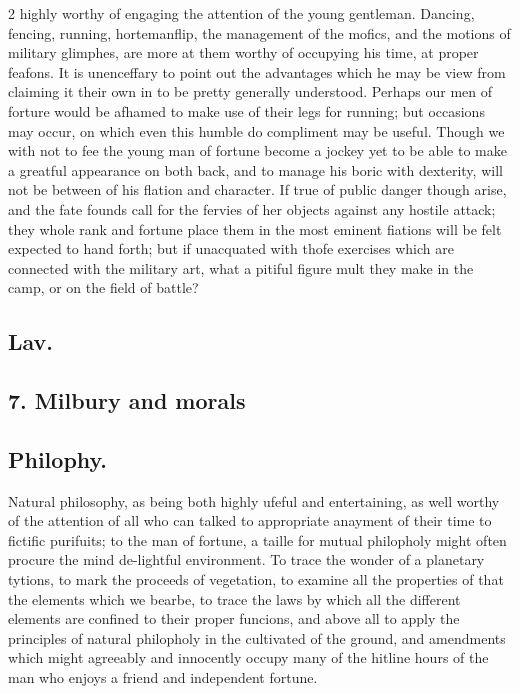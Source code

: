 \documentclass[10pt]{article}
\begin{document}
\begin{multicols}{2}\raggedcolumns
highly worthy of engaging the attention of the young gentleman. Dancing, fencing, running, hortemanflip, the management of the mofics, and the motions of military glimphes, are more at them worthy of occupying his time, at proper feafons. It is unenceffary to point out the advantages which he may be view from claiming it their own in to be pretty generally understood. Perhaps our men of forture would be afhamed to make use of their legs for running; but occasions may occur, on which even this humble do compliment may be useful. Though we with not to fee the young man of fortune become a jockey yet to be able to make a greatful appearance on both back, and to manage his boric with dexterity, will not be between of his flation and character. If true of public danger though arise, and the fate founds call for the fervies of her objects against any hostile attack; they whole rank and fortune place them in the most eminent fiations will be felt expected to hand forth; but if unacquated with thofe exercises which are connected with the military art, what a pitiful figure mult they make in the camp, or on the field of battle?

\subsection*{Lav.}
\subsection*{7. Milbury and morals}
\subsection*{Philophy.}
Natural philosophy, as being both highly ufeful and entertaining, as well worthy of the attention of all who can talked to appropriate anayment of their time to fictific purifuits; to the man of fortune, a taille for mutual philopholy might often procure the mind de-lightful environment. To trace the wonder of a planetary tytions, to mark the proceeds of vegetation, to examine all the properties of that the elements which we bearbe, to trace the laws by which all the different elements are confined to their proper funcions, and above all to apply the principles of natural philopholy in the cultivated of the ground, and amendments which might agreeably and innocently occupy many of the hitline hours of the man who enjoys a friend and independent fortune.


\end{multicols}
\end{document}
